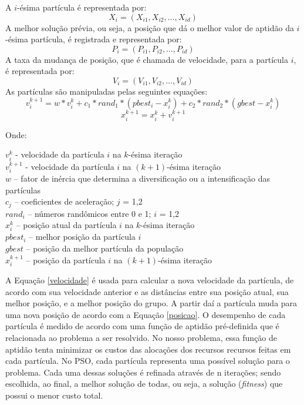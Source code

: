 \documentclass[a4paper,10pt]{article}
\begin{document}
A $i$-ésima partícula é representada por:
\begin{equation}
X_{i} = (X_{i1}, X_{i2},\ldots, X_{id})
\end{equation}
A melhor solução prévia, ou seja, a posição que dá o melhor valor de aptidão da $i$-ésima partícula, é registrada e representada por:
\begin{equation}
P_{i} = (P_{i1}, P_{i2},\ldots, P_{id})
\end{equation}
A taxa da mudança de posição, que é chamada de velocidade, para a partícula $i$, é representada por:
\begin{equation}
V_{i} = (V_{i1}, V_{i2},\ldots, V_{id})
\end{equation}
As partículas são manipuladas pelas seguintes equações:
\begin{equation}
v_{i}^{k+1} = w*v_{i}^k + c_{1}*rand_{1} * (pbest_{i} - x_{i}^k) + c_{2}*rand_{2} * (gbest - x_{i}^k) \label{velocidade}
\end{equation}
\begin{equation}
x_{i}^{k+1} = x_{i}^k + v_{i}^{k+1} \label{posicao}
\end{equation}

Onde:\\

\begin{description}
\item
$v_{i}^k$ - velocidade da partícula $i$ na $k$-ésima iteração\\
$v_{i}^{k+1}$ - velocidade da partícula $i$ na $(k+1)$-ésima iteração\\
$w$ – fator de inércia que determina a diversificação ou a intensificação das partículas\\
$c_{j}$ – coeficientes de aceleração; $j$ = 1,2\\
$rand_{i}$ – números randômicos entre 0 e 1; $i$ = 1,2\\
$x_{i}^k$ – posição atual da partícula $i$ na $k$-ésima iteração\\
$pbest_{i}$ – melhor posição da partícula $i$\\
$gbest$ – posição da melhor partícula da população\\
$x_{i}^{k+1}$ – posição da partícula $i$ na $(k+1)$-ésima iteração\\
\end{description}

A Equação \eqref{velocidade} é usada para calcular a nova velocidade da partícula, de acordo com sua velocidade 
anterior e as distâncias entre sua posição atual, sua melhor posição, e a melhor posição do grupo. 
A partir daí a partícula muda para uma nova posição de acordo com a Equação \eqref{posicao}. O desempenho de cada 
partícula é medido de acordo com uma função de aptidão pré-definida que é relacionada ao problema a ser 
resolvido. No nosso problema, essa função de aptidão tenta minimizar os custos das alocações dos recursos 
recursos feitas em cada partícula. No PSO, cada partícula representa uma possível solução para o problema.
Cada uma dessas soluções é refinada através de n iterações; sendo escolhida, ao final, a melhor solução de todas,
ou seja, a solução (\emph{fitness}) que possui o menor custo total.\\
\end{document}
